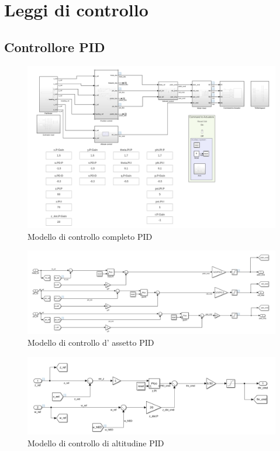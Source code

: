 \section{Leggi di controllo}
\subsection{Controllore PID}

\begin{figure}
	\centering
	\includegraphics[width=1\textwidth]{DescrizioneAutopilota/Figure/completopid}
	\caption{Modello di controllo completo PID}
\end{figure}

\begin{figure}
	\centering
	\includegraphics[width=1\textwidth]{DescrizioneAutopilota/Figure/attitudecontrollerpid}
	\caption{Modello di controllo d' assetto PID}
\end{figure}

\begin{figure}
	\centering
	\includegraphics[width=1\textwidth]{DescrizioneAutopilota/Figure/altitudecontrollerpid}
	\caption{Modello di controllo di altitudine PID}
\end{figure}

